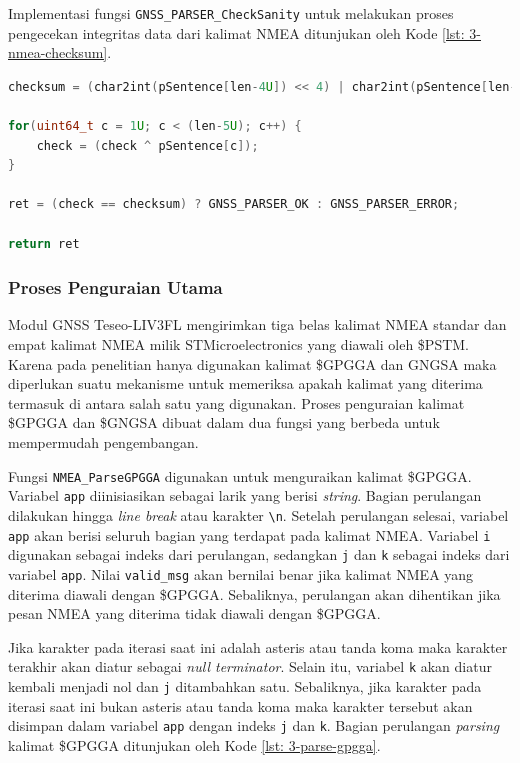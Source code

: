 Implementasi fungsi \texttt{GNSS\_PARSER\_CheckSanity} untuk melakukan proses pengecekan integritas data dari kalimat NMEA ditunjukan oleh Kode \ref{lst: 3-nmea-checksum}.

\vspace{0.3cm}
\begin{lstlisting}[language=c, style=mystyle, caption={\textit{Checksum} Kalimat NMEA}, label={lst: 3-nmea-checksum}]
checksum = (char2int(pSentence[len-4U]) << 4) | char2int(pSentence[len-3U]);

for(uint64_t c = 1U; c < (len-5U); c++) {
	check = (check ^ pSentence[c]);
}

ret = (check == checksum) ? GNSS_PARSER_OK : GNSS_PARSER_ERROR;

return ret
\end{lstlisting}

\subsubsection{Proses Penguraian Utama}
Modul GNSS Teseo-LIV3FL mengirimkan tiga belas kalimat NMEA standar dan empat kalimat NMEA milik STMicroelectronics yang diawali oleh \$PSTM. Karena pada penelitian hanya digunakan kalimat \$GPGGA dan GNGSA maka diperlukan suatu mekanisme untuk memeriksa apakah kalimat yang diterima termasuk di antara salah satu yang digunakan. Proses penguraian kalimat \$GPGGA dan \$GNGSA dibuat dalam dua fungsi yang berbeda untuk mempermudah pengembangan. 

Fungsi \texttt{NMEA\_ParseGPGGA} digunakan untuk menguraikan kalimat \$GPGGA. Variabel \texttt{app} diinisiasikan sebagai larik yang berisi \textit{string}. Bagian perulangan dilakukan hingga \textit{line break} atau karakter \texttt{\textbackslash n}. Setelah perulangan selesai, variabel \texttt{app} akan berisi seluruh bagian yang terdapat pada kalimat NMEA. Variabel \texttt{i} digunakan sebagai indeks dari perulangan, sedangkan \texttt{j} dan \texttt{k} sebagai indeks dari variabel \texttt{app}. Nilai \texttt{valid\_msg} akan bernilai benar jika kalimat NMEA yang diterima diawali dengan \$GPGGA. Sebaliknya, perulangan akan dihentikan jika pesan NMEA yang diterima tidak diawali dengan \$GPGGA.

Jika karakter pada iterasi saat ini adalah asteris atau tanda koma maka karakter terakhir akan diatur sebagai \textit{null terminator}. Selain itu, variabel \texttt{k} akan diatur kembali menjadi nol dan \texttt{j} ditambahkan satu. Sebaliknya, jika karakter pada iterasi saat ini bukan asteris atau tanda koma maka karakter tersebut akan disimpan dalam variabel \texttt{app} dengan indeks \texttt{j} dan \texttt{k}. Bagian perulangan \textit{parsing} kalimat \$GPGGA ditunjukan oleh Kode \ref{lst: 3-parse-gpgga}.

